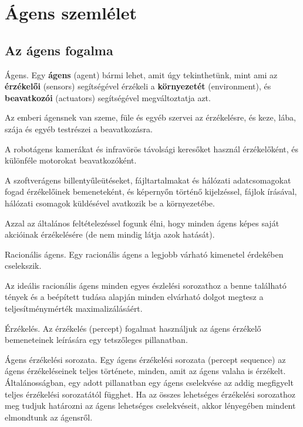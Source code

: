 \section{Ágens szemlélet}

\subsection{Az ágens fogalma}

\begin{definicio}
    Ágens.
    Egy \textbf{ágens} (agent) bármi lehet, amit úgy tekinthetünk, mint ami az
    \textbf{érzékelői} (sensors) segítségével érzékeli a \textbf{környezetét}
    (environment), és \textbf{beavatkozói} (actuators) segítségével
    megváltoztatja azt.

    Az emberi ágensnek van szeme, füle és egyéb szervei az érzékelésre, és keze,
    lába, szája és egyéb testrészei a beavatkozásra.

    A robotágens kamerákat és infravörös távolsági keresőket használ
    érzékelőként, és különféle motorokat beavatkozóként.

    A szoftverágens billentyűleütéseket, fájltartalmakat és hálózati
    adatcsomagokat fogad érzékelőinek bemeneteként, és képernyőn történő
    kijelzéssel, fájlok írásával, hálózati csomagok küldésével avatkozik be a
    környezetébe.

    Azzal az általános feltételezéssel fogunk élni, hogy minden ágens képes
    saját akcióinak érzékelésére (de nem mindig látja azok hatását).
\end{definicio}

\begin{definicio}
    Racionális ágens.
    Egy racionális ágens a legjobb várható kimenetel érdekében cselekszik.

    Az ideális racionális ágens minden egyes észlelési sorozathoz a benne
    található tények és a beépített tudása alapján minden elvárható dolgot
    megtesz a teljesítménymérték maximalizálásáért.
\end{definicio}

\begin{definicio}
    Érzékelés.
    Az érzékelés (percept) fogalmat használjuk az ágens érzékelő bemeneteinek
    leírására egy tetszőleges pillanatban.
\end{definicio}

\begin{definicio}
    Ágens érzékelési sorozata.
    Egy ágens érzékelési sorozata (percept sequence) az ágens érzékeléseinek
    teljes története, minden, amit az ágens valaha is érzékelt. Általánosságban,
    egy adott pillanatban egy ágens cselekvése az addig megfigyelt teljes
    érzékelési sorozatától függhet. Ha az összes lehetséges érzékelési
    sorozathoz meg tudjuk határozni az ágens lehetséges cselekvéseit, akkor
    lényegében mindent elmondtunk az ágensről.
\end{definicio}


